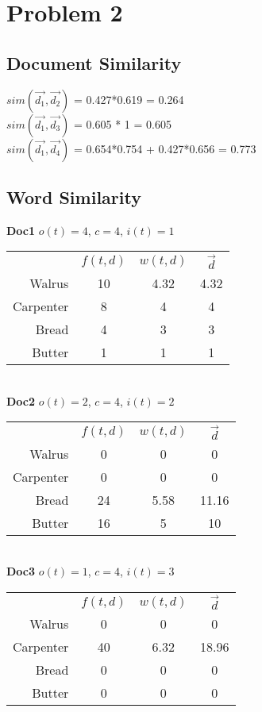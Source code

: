 \documentclass{article}
\begin{document}
\section[B]{Problem 2}
\subsection {Document Similarity}
$sim(\vec{d_1},\vec{d_2})$ = 0.427*0.619 = 0.264 \\
$sim(\vec{d_1},\vec{d_3})$ = 0.605 * 1 = 0.605 \\
$sim(\vec{d_1},\vec{d_4})$ = 0.654*0.754 + 0.427*0.656 = 0.773 \\

\subsection {Word Similarity}
\vspace{5mm}
\textbf{Doc1}
$o(t) = 4$, $c = 4$, $i(t) = 1$

\begin{tabular}{ r|c|c|c| }
\multicolumn{1}{r}{}
 & \multicolumn{1}{c}{$f(t,d)$}
 & \multicolumn{1}{c}{$w(t,d)$}
 & \multicolumn{1}{c}{$\vec{d}$} \\
\cline{2-4}
Walrus & 10 & 4.32 & 4.32 \\
\cline{2-4}
Carpenter & 8 & 4 & 4 \\
\cline{2-4}
Bread & 4 & 3 & 3 \\
\cline{2-4}
Butter & 1 & 1 & 1 \\
\cline{2-4}
\end{tabular} \\


\textbf{Doc2}
$o(t) = 2$, $c = 4$, $i(t) = 2$

\begin{tabular}{ r|c|c|c| }
\multicolumn{1}{r}{}
 & \multicolumn{1}{c}{$f(t,d)$}
 & \multicolumn{1}{c}{$w(t,d)$}
 & \multicolumn{1}{c}{$\vec{d}$} \\
\cline{2-4}
Walrus & 0 & 0 & 0 \\
\cline{2-4}
Carpenter & 0 & 0 & 0 \\
\cline{2-4}
Bread & 24 & 5.58 & 11.16 \\
\cline{2-4}
Butter & 16 & 5 & 10 \\
\cline{2-4}
\end{tabular} \\

\textbf{Doc3}
$o(t) = 1$, $c = 4$, $i(t) = 3$

\begin{tabular}{ r|c|c|c| }
\multicolumn{1}{r}{}
 & \multicolumn{1}{c}{$f(t,d)$}
 & \multicolumn{1}{c}{$w(t,d)$}
 & \multicolumn{1}{c}{$\vec{d}$} \\
\cline{2-4}
Walrus & 0 & 0 & 0 \\
\cline{2-4}
Carpenter & 40 & 6.32 & 18.96 \\
\cline{2-4}
Bread & 0 & 0 & 0 \\
\cline{2-4}
Butter & 0 & 0 & 0 \\
\cline{2-4}
\end{tabular} \\
\end{document}
